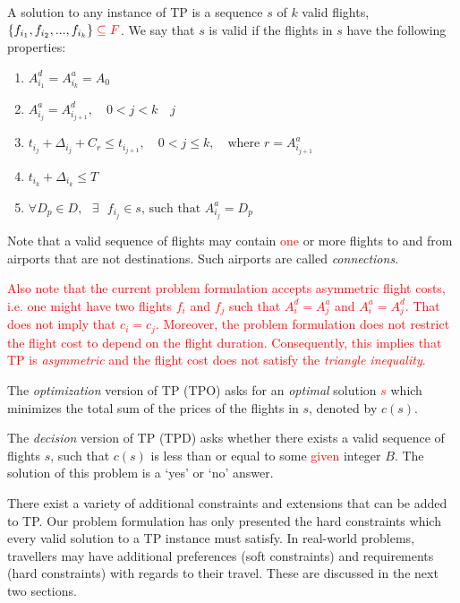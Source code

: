 \documentclass{article}
\theoremstyle{definition}
\begin{document}
A solution to any instance of TP is a sequence $s$ of $k$ valid flights, $\{f_{i_{1}}, f_{i_{2}},...,f_{i_{k}}\}\textcolor{red}{ \\ \subseteq F} $. We say that $s$ is valid if the flights in $s$ have the following properties:

\begin{enumerate}
\color{red}
\item $A^{d}_{i_{1}} = A^{a}_{i_{k}} = A_{0}$
\item $ A^{a}_{i_{j}} = A^{d}_{i_{j+1}},  \quad 0 < j < k  \quad j$
\item $ t_{i_{j}} + \Delta_{i_{j}} + C_{r} \leq t_{i_{j+1}}, \quad 0 < j \leq k, \quad \textrm{where } r = A^{a}_{i_{j+1}}$
\item $t_{i_{k}} + \Delta_{i_{k}} \leq T$
\item $ \forall D_{p} \in D, \textrm{ } \exists \textrm{ } f_{i_{j}} \in s \textrm{, such that } A^{a}_{i_{j}} = D_{p} $
\end{enumerate}

Note that a valid sequence of flights may contain \textcolor{red}{one} or more flights to and from airports that are not destinations. Such airports are called \textit{connections}.

\textcolor{red}{Also note that the current problem formulation accepts asymmetric flight costs, i.e. one might have two flights $f_{i}$ and $f_{j}$ such that $A^{d}_{i} = A^{a}_{j}$ and $A^{a}_{i} = A^{d}_{j}$. That does not imply that $c_{i} = c_{j}$. Moreover, the problem formulation does not restrict the flight cost to depend on the flight duration. Consequently, this implies that TP is \textit{asymmetric} and the flight cost does not satisfy the \textit{triangle inequality}.}

The \textit{optimization} version of TP (TPO) asks for an \textit{optimal} solution \textcolor{red}{$s$} which minimizes the total sum of the prices of the flights in $s$, denoted by $c(s)$.

The \textit{decision} version of TP (TPD) asks whether there exists a valid sequence of flights $s$, such that $c(s)$ is less than or equal to some \textcolor{red}{given} integer $B$. The solution of this problem is a `yes' or `no' answer.

There exist a variety of additional constraints and extensions that can be added to TP. Our problem formulation has only presented the hard constraints which every valid solution to a TP instance must satisfy. In real-world problems, travellers may have additional preferences (soft constraints) and requirements (hard constraints) with regards to their travel. These are discussed in the next two sections.
\end{document}

